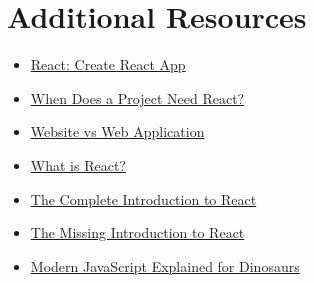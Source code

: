 \section{Additional Resources}

\begin{itemize}[leftmargin=*]
    \item \href{https://reactjs.org/docs/add-react-to-a-new-app.html#create-react-app}{React: Create React App}
    \item \href{https://css-tricks.com/project-need-react/}{When Does a Project Need React?}
    \item \href{https://www.seguetech.com/website-vs-web-application-whats-the-difference/}{Website vs Web Application}
    \item \href{https://learnreact.design/posts/what-is-react}{What is React?}
    \item \href{https://jscomplete.com/learn/complete-intro-react}{The Complete Introduction to React}
    \item \href{https://medium.com/javascript-scene/the-missing-introduction-to-react-62837cb2fd76}{The Missing Introduction to React}
    \item \href{https://medium.com/the-node-js-collection/modern-javascript-explained-for-dinosaurs-f695e9747b70}{Modern JavaScript Explained for Dinosaurs}
\end{itemize}
